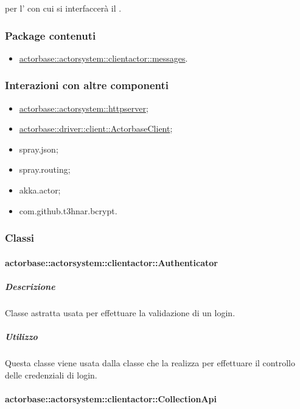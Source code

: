 \documentclass{scalatekids-article}
\begin{document}
 per l' con cui si interfaccerà il .

\subsubsection{Package contenuti}

\begin{itemize}
\item \hyperref[sec:actorbase::actorsystem::clientactor::messages]{actorbase::actorsystem::clientactor::messages}.
\end{itemize}

\subsubsection{Interazioni con altre componenti}

\begin{itemize}
\item \hyperref[sec:actorbase::actorsystem::httpserver]{actorbase::actorsystem::\allowbreak{}httpserver};
\item \hyperref[sec:actorbase::driver::client::ActorbaseClient]{actorbase::driver::\allowbreak{}client::\allowbreak{}ActorbaseClient};
\item spray.json;
\item spray.routing;
\item akka.actor;
\item com.github.t3hnar.bcrypt.
\end{itemize}

\subsubsection{Classi}

\paragraph{actorbase::actorsystem::clientactor::Authenticator}
\label{sec:actorbase::actorsystem::clientactor::Authenticator}

\subparagraph{Descrizione}

Classe astratta usata per effettuare la validazione di un login.

\subparagraph{Utilizzo}

Questa classe viene usata dalla classe che la realizza per effettuare il controllo
delle credenziali di login.

\paragraph{actorbase::actorsystem::clientactor::CollectionApi}
\label{sec:actorbase::actorsystem::clientactor::CollectionApi}
\end{document}
